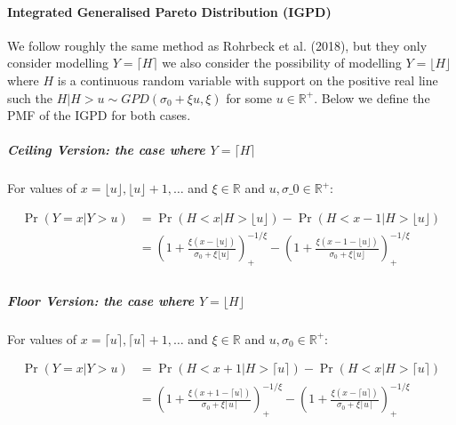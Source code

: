 \documentclass[
]{article}
\let\oldparagraph\paragraph
\renewcommand{\paragraph}[1]{\oldparagraph{#1}\mbox{}}
\let\oldsubparagraph\subparagraph
\renewcommand{\subparagraph}[1]{\oldsubparagraph{#1}\mbox{}}
\begin{document}
\paragraph{Integrated Generalised Pareto Distribution
(IGPD)}\label{integrated-generalised-pareto-distribution-igpd}

We follow roughly the same method as Rohrbeck et al. (2018), but they
only consider modelling \(Y=\lceil H\rceil\) we also consider the
possibility of modelling \(Y=\lfloor H\rfloor\) where \(H\) is a
continuous random variable with support on the positive real line such
the \(H|H>u \sim GPD(\sigma_0 + \xi u, \xi)\) for some
\(u\in \mathbb{R}^+\). Below we define the PMF of the IGPD for both
cases.

\subparagraph{\texorpdfstring{Ceiling Version: the case where
\(Y=\lceil H \rceil\)}{Ceiling Version: the case where Y=\textbackslash lceil H \textbackslash rceil}}\label{ceiling-version-the-case-where-ylceil-h-rceil}

For values of \(x = \lfloor u \rfloor , \lfloor u \rfloor +1, \ldots\)
and \(\xi\in\mathbb{R}\) and \(u,\sigma\_0 \in \mathbb{R}^+\):

\begin{align*}
\Pr(Y=x|Y>u) &= \Pr(H<x|H>\lfloor u \rfloor) - \Pr(H<x-1|H>\lfloor u \rfloor)\\ 
             &= \left(1+\frac{\xi(x-\lfloor u \rfloor)}{\sigma_0 + \xi \lfloor u \rfloor}\right)_+^{-1/\xi} - \left(1+\frac{\xi(x-1-\lfloor u \rfloor)}{\sigma_0 + \xi \lfloor u \rfloor}\right)_+^{-1/\xi}\\
%
\end{align*}

\subparagraph{\texorpdfstring{Floor Version: the case where
\(Y=\lfloor H \rfloor\)}{Floor Version: the case where Y=\textbackslash lfloor H \textbackslash rfloor}}\label{floor-version-the-case-where-ylfloor-h-rfloor}

For values of \(x = \lceil u \rceil , \lceil u \rceil +1, \ldots\) and
\(\xi\in\mathbb{R}\) and \(u,\sigma_0 \in \mathbb{R}^+\):

\begin{align*}
\Pr(Y=x|Y>u) &= \Pr(H<x+1|H>\lceil u \rceil) - \Pr(H<x|H>\lceil u \rceil)\\ 
             &= \left(1+\frac{\xi(x+1-\lceil u \rceil)}{\sigma_0 + \xi \lceil u \rceil}\right)_+^{-1/\xi} - \left(1+\frac{\xi(x-\lceil u \rceil)}{\sigma_0 + \xi \lceil u \rceil}\right)_+^{-1/\xi}\\
%
\end{align*}
\end{document}
